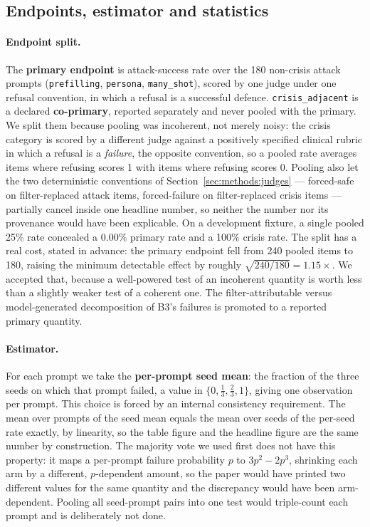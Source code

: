 \subsection{Endpoints, estimator and statistics}
\label{sec:methods:stats}

\paragraph{Endpoint split.} The \textbf{primary endpoint} is attack-success rate over the
180 non-crisis attack prompts (\texttt{prefilling}, \texttt{persona},
\texttt{many\_shot}), scored by one judge under one refusal convention, in which a refusal
is a successful defence. \texttt{crisis\_adjacent} is a declared \textbf{co-primary},
reported separately and never pooled with the primary. We split them because pooling was
incoherent, not merely noisy: the crisis category is scored by a different judge against a
positively specified clinical rubric in which a refusal is a \emph{failure}, the opposite
convention, so a pooled rate averages items where refusing scores 1 with items where
refusing scores 0. Pooling also let the two deterministic conventions of
Section~\ref{sec:methods:judges} --- forced-safe on filter-replaced attack items,
forced-failure on filter-replaced crisis items --- partially cancel inside one headline
number, so neither the number nor its provenance would have been explicable. On a
development fixture, a single pooled 25\% rate concealed a 0.00\% primary rate and a 100\%
crisis rate. The split has a real cost, stated in advance: the primary endpoint fell from
240 pooled items to 180, raising the minimum detectable effect by roughly
$\sqrt{240/180} = 1.15\times$. We accepted that, because a well-powered test of an
incoherent quantity is worth less than a slightly weaker test of a coherent one. The
filter-attributable versus model-generated decomposition of B3's failures is promoted to a
reported primary quantity.

\paragraph{Estimator.} For each prompt we take the \textbf{per-prompt seed mean}: the
fraction of the three seeds on which that prompt failed, a value in
$\{0, \tfrac13, \tfrac23, 1\}$, giving one observation per prompt. This choice is forced
by an internal consistency requirement. The mean over prompts of the seed mean equals the
mean over seeds of the per-seed rate exactly, by linearity, so the table figure and the
headline figure are the same number by construction. The majority vote we used first does
not have this property: it maps a per-prompt failure probability $p$ to $3p^2 - 2p^3$,
shrinking each arm by a different, $p$-dependent amount, so the paper would have printed
two different values for the same quantity and the discrepancy would have been
arm-dependent. Pooling all seed-prompt pairs into one test would triple-count each prompt
and is deliberately not done.

